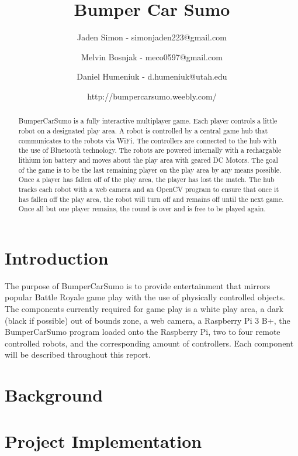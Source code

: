 \documentclass[11pt]{ieeeconf}
\title{Bumper Car Sumo}
\author{Jaden Simon - simonjaden223@gmail.com \\ \and
	   Melvin Bosnjak - meco0597@gmail.com \\ \and
	   Daniel Humeniuk - d.humeniuk@utah.edu \\ \and
	   http://bumpercarsumo.weebly.com/}
\begin{document}
\maketitle

\begin{abstract}
BumperCarSumo is a fully interactive multiplayer game. Each player controls a little robot on a designated play area. A robot is controlled by a central game hub that communicates to the robots via WiFi. The controllers are connected to the hub with the use of Bluetooth technology. The robots are powered internally with a rechargable lithium ion battery and moves about the play area with geared DC Motors. The goal of the game is to be the last remaining player on the play area by any means possible. Once a player has fallen off of the play area, the player has lost the match. The hub tracks each robot with a web camera and an OpenCV program to ensure that once it has fallen off the play area, the robot will turn off and remains off until the next game. Once all but one player remains, the round is over and is free to be played again.
\end{abstract}

\section{Introduction}
The purpose of BumperCarSumo is to provide entertainment that mirrors popular Battle Royale game play with the use of physically controlled objects. The components currently required for game play is a white play area, a dark (black if possible) out of bounds zone, a web camera, a Raspberry Pi 3 B+, the BumperCarSumo program loaded onto the Raspberry Pi, two to four remote controlled robots, and the corresponding amount of controllers. Each component will be described throughout this report. 

\section{Background}


\section{Project Implementation}
\end{document}
